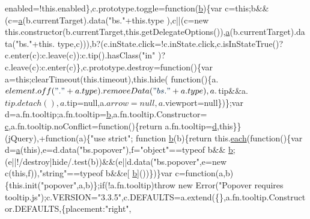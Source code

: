 \begin{DoxyCode}
{      enabled=!this.enabled\},c.prototype.toggle=\textcolor{keyword}{function}(\hyperlink{a00029_ac0431efac4d7c393d1e70b86115cb93f}{b})\{var c=\textcolor{keyword}{this};b&&(c=\hyperlink{a00029_ae8f6b400ed3390908c5cdeebed3a82b9}{a}(b.currentTarget).data(\textcolor{stringliteral}{"bs."}+this.type
      ),c||(c=\textcolor{keyword}{new} this.constructor(b.currentTarget,\textcolor{keyword}{this}.getDelegateOptions()),\hyperlink{a00029_ae8f6b400ed3390908c5cdeebed3a82b9}{a}(b.currentTarget).data(\textcolor{stringliteral}{"bs."}+this.
      type,c))),b?(c.inState.click=!c.inState.click,c.isInStateTrue()?c.enter(c):c.leave(c)):c.tip().hasClass(\textcolor{stringliteral}{"in"}
      )?c.leave(c):c.enter(c)\},c.prototype.destroy=\textcolor{keyword}{function}()\{var a=\textcolor{keyword}{this};clearTimeout(this.timeout),this.hide(\textcolor{keyword}{
      function}()\{a.$element.off(\textcolor{stringliteral}{"."}+a.type).removeData(\textcolor{stringliteral}{"bs."}+a.type),a.$tip&&a.$tip.detach(),a.$tip=null,a.$arrow=null
      ,a.$viewport=null\})\};var d=a.fn.tooltip;a.fn.tooltip=\hyperlink{a00029_ac0431efac4d7c393d1e70b86115cb93f}{b},a.fn.tooltip.Constructor=
      \hyperlink{a00029_ad9d1ac02e33c4aed62ad517a7cb8b3fb}{c},a.fn.tooltip.noConflict=\textcolor{keyword}{function}()\{\textcolor{keywordflow}{return} a.fn.tooltip=\hyperlink{a00029_aeb337d295abaddb5ec3cb34cc2e2bbc9}{d},\textcolor{keyword}{this}\}\}(jQuery),+\textcolor{keyword}{function}(a)\{\textcolor{stringliteral}{"use strict"};\textcolor{keyword}{
      function} \hyperlink{a00029_ac0431efac4d7c393d1e70b86115cb93f}{b}(b)\{\textcolor{keywordflow}{return} this.\hyperlink{a00030_a18d9b499a0765bf2fe5f372ff2fc0236}{each}(\textcolor{keyword}{function}()\{var d=\hyperlink{a00029_ae8f6b400ed3390908c5cdeebed3a82b9}{a}(\textcolor{keyword}{this}),e=d.data(\textcolor{stringliteral}{"bs.popover"}),f=\textcolor{stringliteral}{"object"}==typeof b&&
      \hyperlink{a00029_ac0431efac4d7c393d1e70b86115cb93f}{b};(e||!/destroy|hide/.test(b))&&(e||d.data(\textcolor{stringliteral}{"bs.popover"},e=\textcolor{keyword}{new} c(\textcolor{keyword}{this},f)),\textcolor{stringliteral}{"string"}==typeof b&&e[
      \hyperlink{a00029_ac0431efac4d7c393d1e70b86115cb93f}{b}]())\})\}var c=\textcolor{keyword}{function}(a,b)\{this.init(\textcolor{stringliteral}{"popover"},a,b)\};\textcolor{keywordflow}{if}(!a.fn.tooltip)\textcolor{keywordflow}{throw} \textcolor{keyword}{new} Error(\textcolor{stringliteral}{"Popover requires
       tooltip.js"});c.VERSION=\textcolor{stringliteral}{"3.3.5"},c.DEFAULTS=a.extend(\{\},a.fn.tooltip.Constructor.DEFAULTS,\{placement:\textcolor{stringliteral}{"right"},
}
\end{DoxyCode}
